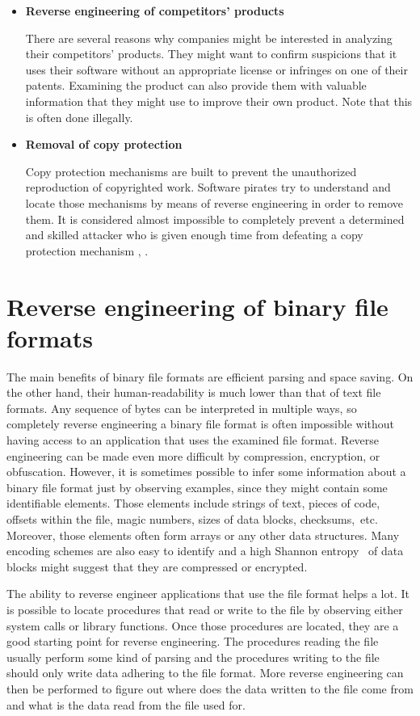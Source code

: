 \documentclass[thesis=B,english]{FITthesis}[2012/10/20]
\begin{document}
\begin{itemize}
		\item \textbf{Reverse engineering of competitors' products}
		
		There are several reasons why companies might be interested in analyzing their competitors' products. They might want to confirm suspicions that it uses their software without an appropriate license or infringes on one of their patents. Examining the product can also provide them with valuable information that they might use to improve their own product. Note that this is often done illegally.
		
		\item \textbf{Removal of copy protection}
		
		Copy protection mechanisms are built to prevent the unauthorized reproduction of copyrighted work. Software pirates try to understand and locate those mechanisms by means of reverse engineering in order to remove them. It is considered almost impossible to completely prevent a determined and skilled attacker who is given enough time from defeating a copy protection mechanism \cite{copy_protection}, \cite{copy_protection2}.
		
	\end{itemize}
	
	\section{Reverse engineering of binary file formats}
	
	The main benefits of binary file formats are efficient parsing and space saving. On the other hand, their human-readability is much lower than that of text file formats. Any sequence of bytes can be interpreted in multiple ways, so completely reverse engineering a binary file format is often impossible without having access to an application that uses the examined file format. Reverse engineering can be made even more difficult by compression, encryption, or obfuscation. However, it is sometimes possible to infer some information about a binary file format just by observing examples, since they might contain some identifiable elements. Those elements include strings of text, pieces of code, offsets within the file, magic numbers, sizes of data blocks, checksums,~etc. Moreover, those elements often form arrays or any other data structures. Many encoding schemes are also easy to identify and a high Shannon entropy~\cite{shannon} of data blocks might suggest that they are compressed or encrypted.
	
	The ability to reverse engineer applications that use the file format helps a lot. It is possible to locate procedures that read or write to the file by observing either system calls or library functions. Once those procedures are located, they are a good starting point for reverse engineering. The procedures reading the file usually perform some kind of parsing and the procedures writing to the file should only write data adhering to the file format. More reverse engineering can then be performed to figure out where does the data written to the file come from and what is the data read from the file used for. 
	
\end{document}
